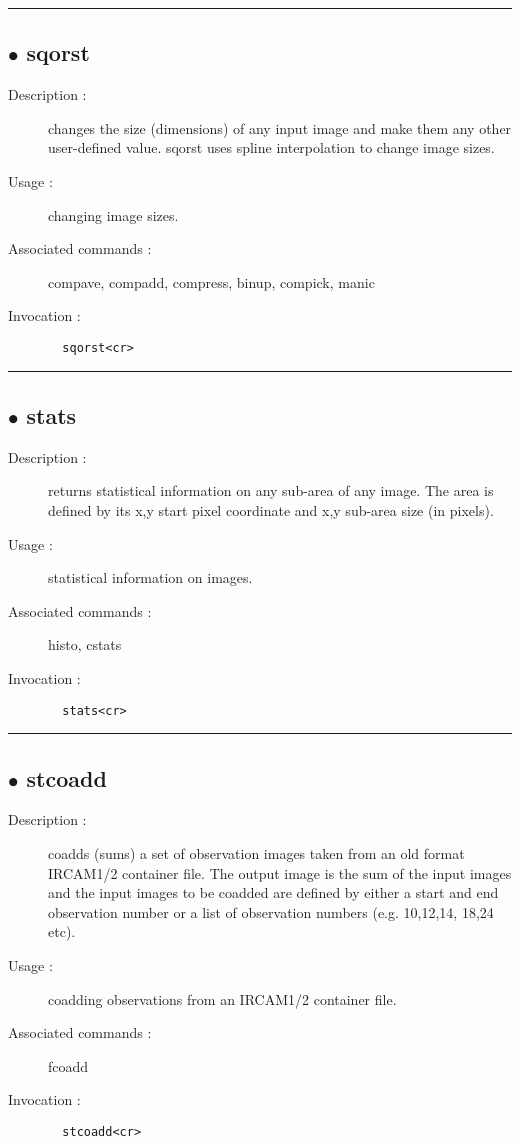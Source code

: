 \hrule \subsection*{$\bullet$ sqorst}
\begin{description}
\item[Description :] changes the size (dimensions) of any input image and make them
any other user-defined value.  sqorst uses spline interpolation to change
image sizes.
\item[Usage :] changing image sizes.
\item[Associated commands :] compave, compadd, compress, binup, compick, manic
\item[Invocation :]

\verb+  sqorst<cr> +\end{description}

\hrule \subsection*{$\bullet$ stats}
\begin{description}
\item[Description :] returns statistical information on any sub-area of any image. The
area is defined by its x,y start pixel coordinate and x,y sub-area size
(in pixels).
\item[Usage :] statistical information on images.
\item[Associated commands :] histo, cstats
\item[Invocation :]

\verb+  stats<cr> +\end{description}

\hrule \subsection*{$\bullet$ stcoadd}
\begin{description}
\item[Description :] coadds (sums) a set of observation images taken from an old
format {\sc IRCAM1/2} container file.  The output image is the sum of the input
images and the input images to be coadded are defined by either a start
and end observation number or a list of observation numbers (e.g.
10,12,14, 18,24 etc).  
\item[Usage :] coadding observations from an {\sc IRCAM1/2} container file.
\item[Associated commands :] fcoadd
\item[Invocation :]

\verb+  stcoadd<cr> +\end{description}

